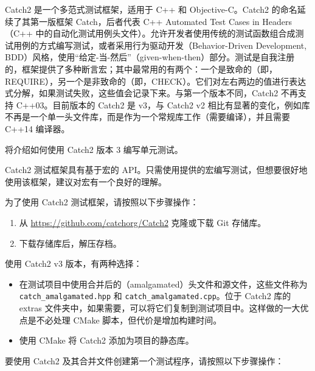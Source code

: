 
Catch2 是一个多范式测试框架，适用于 C++ 和 Objective-C。Catch2 的命名延续了其第一版框架 Catch，后者代表 C++ Automated Test Cases in Headers（C++ 中的自动化测试用例头文件）。允许开发者使用传统的测试函数组合成测试用例的方式编写测试，或者采用行为驱动开发（Behavior-Driven Development, BDD）风格，使用“给定-当-然后”（given-when-then）部分。测试是自我注册的，框架提供了多种断言宏；其中最常用的有两个：一个是致命的（即，REQUIRE），另一个是非致命的（即，CHECK）。它们对左右两边的值进行表达式分解，如果测试失败，这些值会记录下来。与第一个版本不同，Catch2 不再支持 C++03。目前版本的 Catch2 是 v3，与 Catch2 v2 相比有显著的变化，例如库不再是一个单一头文件库，而是作为一个常规库工作（需要编译），并且需要 C++14 编译器。

\begin{myNotic}
将介绍如何使用 Catch2 版本 3 编写单元测试。
\end{myNotic}


Catch2 测试框架具有基于宏的 API。只需使用提供的宏编写测试，但想要很好地使用该框架，建议对宏有一个良好的理解。


为了使用 Catch2 测试框架，请按照以下步骤操作：

\begin{enumerate}
\item
从 \url{https://github.com/catchorg/Catch2} 克隆或下载 Git 存储库。

\item
下载存储库后，解压存档。
\end{enumerate}

使用 Catch2 v3 版本，有两种选择：

\begin{itemize}
\item
在测试项目中使用合并后的（amalgamated）头文件和源文件，这些文件称为 \verb|catch_amalgamated.hpp| 和 \verb|catch_amalgamated.cpp|。位于 Catch2 库的 extras 文件夹中，如果需要，可以将它们复制到测试项目中。这样做的一大优点是不必处理 CMake 脚本，但代价是增加构建时间。

\item
使用 CMake 将 Catch2 添加为项目的静态库。
\end{itemize}

要使用 Catch2 及其合并文件创建第一个测试程序，请按照以下步骤操作：

